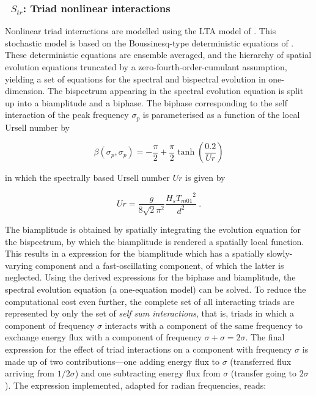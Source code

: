 \vsssub
\subsubsection{~$S_{tr}$: Triad nonlinear interactions} \label{sec:TR1}
\vsssub


\noindent
Nonlinear triad interactions are modelled using the LTA model of 
\citep{rep:Eld96}. This stochastic model is based on the 
Boussinesq-type deterministic equations of \citep{art:MS93}. 
These deterministic equations are ensemble averaged, and the hierarchy 
of spatial evolution equations truncated by a zero-fourth-order-cumulant 
assumption, yielding a set of equations for the spectral and bispectral 
evolution in one-dimension. The bispectrum appearing in the spectral 
evolution equation is split up into a biamplitude and a biphase. The 
biphase corresponding to the self interaction of the peak frequency 
$\sigma_p$ is parameterised as a function of the local Ursell number by

\begin{equation}
   \beta(\sigma_p,\sigma_p) = -\frac{\pi}{2} + \frac{\pi}{2}\tanh\left( \frac{0.2}{Ur} \right)
   \label{eq:biphase}
\end{equation}

in which the spectrally based Ursell number $Ur$ is given by

\begin{equation}
   Ur = \frac{g}{8\sqrt{2} \pi^2} \frac{H_s {T_{m01}}^2}{d^2}\ .
   \label{eq:ursell}
\end{equation}

The biamplitude is obtained by spatially integrating the evolution equation 
for the bispectrum, by which the biamplitude is rendered a spatially local 
function. This results in a expression for the biamplitude which has a 
spatially slowly-varying component and a fast-oscillating component, of which 
the latter is neglected. Using the derived expressions for the biphase and 
biamplitude, the spectral evolution equation (a one-equation model) can be 
solved. To reduce the computational cost even further, the complete set of 
all interacting triads are represented by only the set of \textit{self sum interactions}, 
that is, triads in which a component of frequency $\sigma$ interacts with a 
component of the same frequency to exchange energy flux with a 
component of frequency $\sigma + \sigma = 2\sigma$. The final expression for the effect of 
triad interactions on a component with frequency $\sigma$ is made up of two 
contributions---one adding energy flux to $\sigma$ (transferred flux arriving 
from $1/2 \sigma$) and one subtracting energy flux from $\sigma$ (transfer 
going to $2 \sigma$). The expression implemented, adapted for radian 
frequencies, reads:

